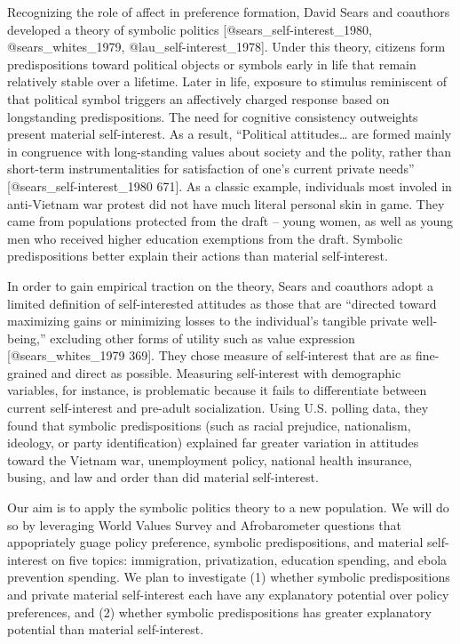 \documentclass[]{article}
\begin{document}
Recognizing the role of affect in preference formation, David Sears and
coauthors developed a theory of symbolic politics
{[}@sears\_self-interest\_1980, @sears\_whites\_1979,
@lau\_self-interest\_1978{]}. Under this theory, citizens form
predispositions toward political objects or symbols early in life that
remain relatively stable over a lifetime. Later in life, exposure to
stimulus reminiscent of that political symbol triggers an affectively
charged response based on longstanding predispositions. The need for
cognitive consistency outweights present material self-interest. As a
result, ``Political attitudes\ldots{} are formed mainly in congruence
with long-standing values about society and the polity, rather than
short-term instrumentalities for satisfaction of one's current private
needs'' {[}@sears\_self-interest\_1980 671{]}. As a classic example,
individuals most involed in anti-Vietnam war protest did not have much
literal personal skin in game. They came from populations protected from
the draft -- young women, as well as young men who received higher
education exemptions from the draft. Symbolic predispositions better
explain their actions than material self-interest.

In order to gain empirical traction on the theory, Sears and coauthors
adopt a limited definition of self-interested attitudes as those that
are ``directed toward maximizing gains or minimizing losses to the
individual's tangible private well-being,'' excluding other forms of
utility such as value expression {[}@sears\_whites\_1979 369{]}. They
chose measure of self-interest that are as fine-grained and direct as
possible. Measuring self-interest with demographic variables, for
instance, is problematic because it fails to differentiate between
current self-interest and pre-adult socialization. Using U.S. polling
data, they found that symbolic predispositions (such as racial
prejudice, nationalism, ideology, or party identification) explained far
greater variation in attitudes toward the Vietnam war, unemployment
policy, national health insurance, busing, and law and order than did
material self-interest.

Our aim is to apply the symbolic politics theory to a new population. We
will do so by leveraging World Values Survey and Afrobarometer questions
that appopriately guage policy preference, symbolic predispositions, and
material self-interest on five topics: immigration, privatization,
education spending, and ebola prevention spending. We plan to
investigate (1) whether symbolic predispositions and private material
self-interest each have any explanatory potential over policy
preferences, and (2) whether symbolic predispositions has greater
explanatory potential than material self-interest.
\end{document}
